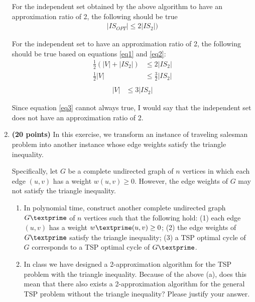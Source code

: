 \documentclass[paper=a4, fontsize=11pt]{scrartcl} %
\numberwithin{figure}{section} %
\numberwithin{table}{section} %
\begin{document}
\begin{enumerate}
For the independent set obtained by the above algorithm to have an approximation ratio of 2, the following should be true
\begin{align}
\label{eq2} 
\left | IS_{OPT} \right | \leq 2 \left | IS_2 \right |)
\end{align}

For the independent set to have an approximation ratio of 2, the following should be true based on equations \ref{eq1} and \ref{eq2}:
\begin{align*}
\frac{1}{2} (\left | V \right | + \left | IS_2 \right |) &\leq 2\left | IS_2 \right |\\
\frac{1}{2} \left | V \right | &\leq \frac{3}{2} \left | IS_2 \right |\\
\end{align*}
\begin{align}
\label{eq3} 
\left | V \right | &\leq 3 \left | IS_2 \right |
\end{align}

Since equation \ref{eq3} cannot always true, I would say that the independent set does not have an approximation ratio of 2.

\item \textbf{(20 points)} In this exercise, we transform an instance of traveling salesman problem into another instance whose edge weights satisfy the triangle inequality.

Specifically, let $G$ be a complete undirected graph of $n$ vertices in which each edge $(u, v)$ has a weight $w(u, v) \geq 0$. However, the edge weights of $G$ may not satisfy the triangle inequality.

\begin{enumerate}
\item In polynomial time, construct another complete undirected graph $G\textprime$ of $n$ vertices such that the following hold: (1) each edge $(u,v)$ has a weight $w\textprime(u,v) \geq 0$; (2) the edge weights of $G\textprime$ satisfy the triangle inequality; (3) a TSP optimal cycle of $G$ corresponds to a TSP optimal cycle of $G\textprime$.

\item In class we have designed a 2-approximation algorithm for the TSP problem with the triangle inequality. Because of the above (a), does this mean that there also exists a 2-approximation algorithm for the general TSP problem without the triangle inequality? Please justify your answer.\\
\end{enumerate}


\end{enumerate}
\end{document}
